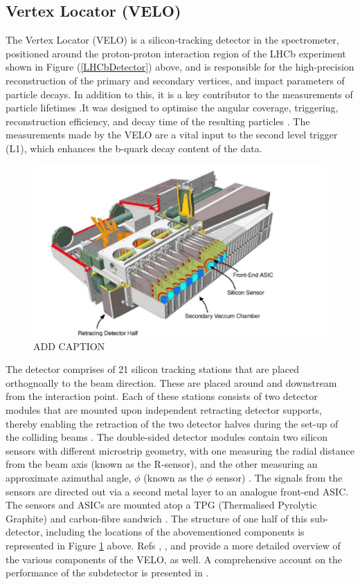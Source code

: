 \subsection{Vertex Locator (VELO)}\label{VELO}
The Vertex Locator (VELO) is a silicon-tracking detector in the spectrometer, positioned around the proton-proton interaction region of the LHCb experiment shown in Figure (\ref{LHCbDetector}) above, and is responsible for the high-precision reconstruction of the primary and secondary vertices, and impact parameters of particle decays. In addition to this, it is a key
contributor to the measurements of particle lifetimes \cite{Kopciewicz_2022}.It was designed to optimise the angular coverage, triggering, reconstruction efficiency, and decay time of the resulting particles \cite{Aaij_2014}. The measurements made by the VELO are a vital input to the second level trigger (L1), which enhances the b-quark decay content of the data.\\
\begin{figure}[H]
    \centering
    \includegraphics[scale=0.5]{VELOModule.jpg}
    \caption{ADD CAPTION}
    \label{VELOModule}
\end{figure}
The detector comprises of 21 silicon tracking stations that are placed orthognoally to the beam direction. These are placed around and downstream from the interaction point. Each of these stations consists of two detector modules that are mounted upon independent retracting detector supports, thereby enabling the retraction of the two detector halves during the set-up of the colliding beams \cite{EKLUND200572}. The double-sided detector modules contain two silicon sensors with different microstrip geometry, with one measuring the
radial distance from the beam axis (known as the R-sensor), and the other measuring an approximate azimuthal angle, $\phi$ (known as the $\phi$ sensor) \cite{Kopciewicz_2022}. The signals from the sensors are directed out via a second metal layer to an analogue front-end ASIC. The sensors and ASICs are mounted atop a TPG (Thermalised Pyrolytic Graphite) and carbon-fibre sandwich \cite{EKLUND200572}. The structure of one half of this sub-detector, including the locations of the abovementioned components is represented in Figure \ref{VELOModule} above. Refs \cite{Kopciewicz_2022}, \cite{Aaij_2014}, and \cite{EKLUND200572} provide a more detailed overview of the various components of the VELO, as well. A comprehensive account on the performance of the subdetector
is presented in \cite{Aaij_2014}.
